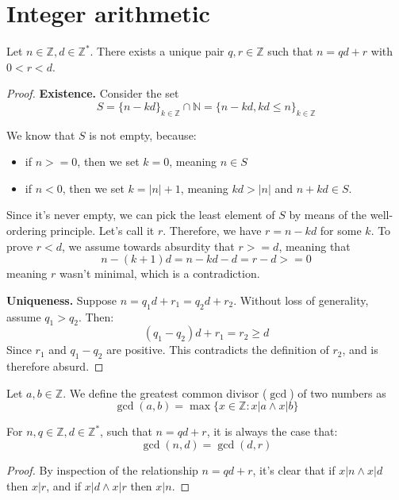 \section{Integer arithmetic}

\begin{definition}
  Let $n \in \mathbb{Z}, d \in \mathbb{Z}^*$. There exists a unique pair $q, r \in \mathbb{Z}$ such that $n = qd + r$ with $0 < r < d$. 
\end{definition}
\begin{proof}
  \textbf{Existence.}
  Consider the set
  \[
    S = \{n - kd\}_{k \in \mathbb{Z}} \cap \mathbb{N} = \{n - kd, kd \leqslant n\}_{k \in \mathbb{Z}}
  \] 

  We know that $S$ is not empty, because: 
  \begin{itemize}
    \item if $n >= 0$, then we set $k = 0$, meaning $n \in S$
    \item if $n < 0$, then we set $k = |n| + 1$, meaning $kd > |n|$ and $n + kd \in S$.
  \end{itemize}
  Since it's never empty, we can pick the least element of $S$ by means of the well-ordering principle. Let's call it $r$. Therefore, we have $r = n - kd$ for some $k$. To prove $r < d$, we assume towards absurdity that $r >= d$, meaning that 
  \[
    n - (k + 1)d = n - kd - d = r - d >= 0
  \]
  meaning $r$ wasn't minimal, which is a contradiction.

  \textbf{Uniqueness.} Suppose $n = q_1d + r_1 = q_2d + r_2$. Without loss of generality, assume $q_1 > q_2$. Then:
  \[
    (q_1 - q_2)d + r_1 = r_2 \geqslant d
  \]
  Since $r_1$ and $q_1 - q_2$ are positive. This contradicts the definition of $r_2$, and is therefore absurd.
\end{proof}

\begin{definition}
  Let $a, b \in \mathbb{Z}$. We define the greatest common divisor ($\gcd$) of two numbers as 
  \[
    \gcd(a, b) = \max\{x \in \mathbb{Z}: x|a \land x|b\}
  \]
\end{definition}
\begin{theorem}
  For $n, q \in \mathbb{Z}, d \in \mathbb{Z}^*$, such that $n = qd + r$, it is always the case that:  
  \[ \gcd(n, d) = \gcd(d, r) \]
\end{theorem}
\begin{proof}
  By inspection of the relationship $n = qd + r$, it's clear that if $x | n \land x | d$ then $x | r$, and if $x | d \land x | r$ then $x | n$.
\end{proof}

